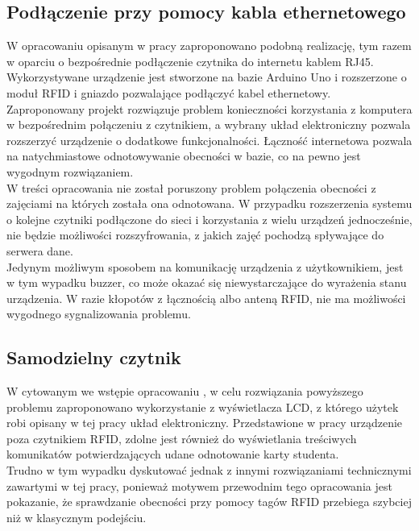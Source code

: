 \documentclass[declaration,shortabstract, mgr]{iithesis}
\begin{document}
\subsection{Podłączenie przy pomocy kabla ethernetowego}
\indent W opracowaniu opisanym w pracy \cite{rfid_serial} zaproponowano podobną realizację, tym razem w oparciu o bezpośrednie podłączenie czytnika do internetu kablem RJ45. Wykorzystywane urządzenie jest stworzone na bazie Arduino Uno i rozszerzone o moduł RFID i gniazdo pozwalające podłączyć kabel ethernetowy. \\
\indent Zaproponowany projekt rozwiązuje problem konieczności korzystania z komputera w bezpośrednim połączeniu z czytnikiem, a wybrany układ elektroniczny pozwala rozszerzyć urządzenie o dodatkowe funkcjonalności. Łączność internetowa pozwala na natychmiastowe odnotowywanie obecności w bazie, co na pewno jest wygodnym rozwiązaniem. \\
\indent W treści opracowania nie został poruszony problem połączenia obecności z zajęciami na których została ona odnotowana. W przypadku rozszerzenia systemu o kolejne czytniki podłączone do sieci i korzystania z wielu urządzeń jednocześnie, nie będzie możliwości rozszyfrowania, z jakich zajęć pochodzą spływające do serwera dane. \\
\indent Jedynym możliwym sposobem na komunikację urządzenia z użytkownikiem, jest w tym wypadku buzzer, co może okazać się niewystarczające do wyrażenia stanu urządzenia. W razie kłopotów z łącznością albo anteną RFID, nie ma możliwości wygodnego sygnalizowania problemu.

\subsection{Samodzielny czytnik }
\indent W cytowanym we wstępie opracowaniu \cite{lcd}, w celu rozwiązania powyższego problemu zaproponowano wykorzystanie z wyświetlacza LCD, z którego użytek robi opisany w tej pracy układ elektroniczny. Przedstawione w pracy urządzenie poza czytnikiem RFID, zdolne jest również do wyświetlania treściwych komunikatów potwierdzających udane odnotowanie karty studenta. \\
\indent Trudno w tym wypadku dyskutować jednak z innymi rozwiązaniami technicznymi zawartymi w tej pracy, ponieważ motywem przewodnim tego opracowania jest pokazanie, że sprawdzanie obecności przy pomocy tagów RFID przebiega szybciej niż w klasycznym podejściu.
\end{document}

